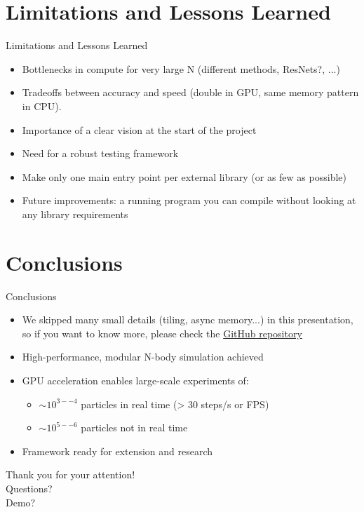 \documentclass{beamer}
\begin{document}
\section{Limitations and Lessons Learned}
\begin{frame}{Limitations and Lessons Learned}
    \begin{itemize}
        \item Bottlenecks in compute for very large N (different methods, ResNets?, ...)
        \item Tradeoffs between accuracy and speed (double in GPU, same memory pattern in CPU).
        \item Importance of a clear vision at the start of the project
        \item Need for a robust testing framework
        \item Make only one main entry point per external library (or as few as possible)
        \item Future improvements: a running program you can compile without looking at any library requirements
    \end{itemize}
\end{frame}

\section{Conclusions}
\begin{frame}{Conclusions}
    \begin{itemize}
        \item We skipped many small details (tiling, async memory...) in this presentation, so if you want to know more, please check the \href{https://github.com/tusca99/N-body-simulation.git}{GitHub repository}
        \item High-performance, modular N-body simulation achieved
        \item GPU acceleration enables large-scale experiments of:
            \begin{itemize}
            \item $\sim 10^{3--4}$ particles in real time (> 30 steps/s or FPS)
            \item $\sim 10^{5--6}$ particles not in real time
            \end{itemize}
        \item Framework ready for extension and research
    \end{itemize}
\end{frame}

\begin{emptyframe}
    \centering
    Thank you for your attention! \\
    Questions? \\
    Demo?
\end{emptyframe}
\end{document}
